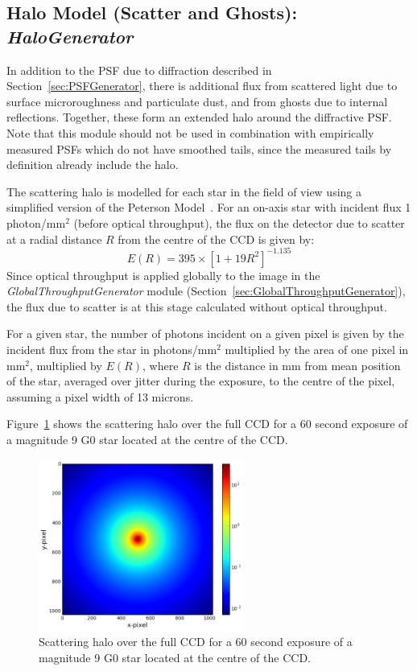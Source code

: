 \documentclass[11pt]{article}      %
\begin{document}
\subsection{Halo Model (Scatter and Ghosts):  {\it HaloGenerator}}
\label{sec:HaloGenerator}

In addition to the PSF due to diffraction described in Section~\ref{sec:PSFGenerator}, there is additional flux from scattered light due to surface microroughness and particulate dust, and from ghosts due to internal reflections. Together, these form an extended  halo around the diffractive PSF. Note that this module should not be used in combination with empirically measured PSFs which do not have smoothed tails, since the measured tails by definition already include the halo.

The scattering halo is modelled for each star in the field of view using a simplified version of the Peterson Model~\cite{Peterson}. For an on-axis star with incident flux 1 photon/mm$^2$ (before optical throughput), the flux on the detector due to scatter at a radial distance $R$ from the centre of the CCD is given by:
$$E(R)=395\times[1+19R^2]^{-1.135}$$
Since optical throughput is applied globally to the image in the {\em GlobalThroughputGenerator} module (Section~\ref{sec:GlobalThroughputGenerator}), the flux due to scatter is at this stage calculated without optical throughput.

For a given star, the number of photons incident on a given pixel is given by the incident flux from the star in photons/mm$^2$ multiplied by the area of one pixel in mm$^2$, multiplied by $E(R)$, where $R$ is the distance in mm from mean position of the star, averaged over jitter during the exposure, to the centre of the pixel, assuming a pixel width of 13 microns.

Figure~\ref{fig:halo} shows the scattering halo over the full CCD for a 60 second exposure of a magnitude 9 G0 star located at the centre of the CCD.

\begin{figure}[htbp]
  \begin{center}
    \includegraphics[width=0.6\textwidth]{halo.png}
    \caption{Scattering halo over the full CCD for a 60 second exposure of a magnitude 9 G0 star located at the centre of the CCD.}
    \label{fig:halo}
  \end{center}
\end{figure}
\end{document}
